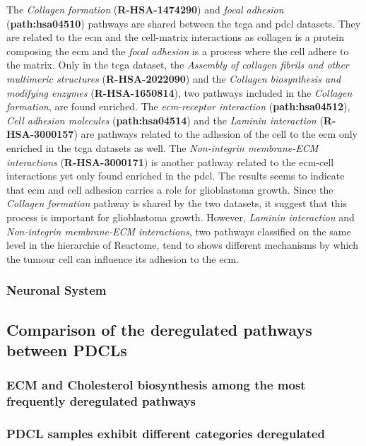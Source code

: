 The \textit{Collagen formation} (\textbf{R-HSA-1474290}) and \textit{focal adhesion} (\textbf{path:hsa04510}) pathways are shared between the \acrshort{tcga} and \acrshort{pdcl} datasets.
They are related to the \acrlong{ecm} and the cell-matrix interactions as collagen is a protein composing the \acrshort{ecm} and the \textit{focal adhesion} is a process where the cell adhere to the matrix.
Only in the \acrshort{tcga} dataset, the \textit{Assembly of collagen fibrils and other multimeric structures} (\textbf{R-HSA-2022090}) and the \textit{Collagen biosynthesis and modifying enzymes} (\textbf{R-HSA-1650814}), two pathways included in the \textit{Collagen formation}, are found enriched.
The \textit{\acrshort{ecm}-receptor interaction} (\textbf{path:hsa04512}), \textit{Cell adhesion molecules} (\textbf{path:hsa04514}) and the \textit{Laminin interaction} (\textbf{R-HSA-3000157}) are pathways related to the adhesion of the cell to the \acrshort{ecm} only enriched in the \acrshort{tcga} datasets as well.
The \textit{Non-integrin membrane-ECM interactions} (\textbf{R-HSA-3000171}) is another pathway related to the \acrshort{ecm}-cell interactions yet only found enriched in the \acrshort{pdcl}.
The results seems to indicate that \acrshort{ecm} and cell adhesion carries a role for glioblastoma growth.
Since the \textit{Collagen formation} pathway is shared by the two datasets, it suggest that this process is important for glioblastoma growth.
However, \textit{Laminin interaction} and \textit{Non-integrin membrane-ECM interactions}, two pathways classified on the same level in the hierarchie of Reactome, tend to shows different mechanisms by which the tumour cell can influence its adhesion to the \acrshort{ecm}.

\subsubsection{Neuronal System}

\subsection{Comparison of the deregulated pathways between PDCLs}

\subsubsection{ECM and Cholesterol biosynthesis among the most frequently deregulated pathways}

\subsubsection{PDCL samples exhibit different categories deregulated}

